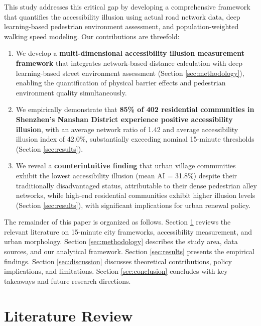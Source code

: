 \documentclass[10pt,conference,compsoc]{IEEEtran}
\begin{document}
This study addresses this critical gap by developing a comprehensive framework that quantifies the accessibility illusion using actual road network data, deep learning-based pedestrian environment assessment, and population-weighted walking speed modeling. Our contributions are threefold:

\begin{enumerate}
    \item We develop a \textbf{multi-dimensional accessibility illusion measurement framework} that integrates network-based distance calculation with deep learning-based street environment assessment (Section \ref{sec:methodology}), enabling the quantification of physical barrier effects and pedestrian environment quality simultaneously.
    \item We empirically demonstrate that \textbf{85\% of 402 residential communities in Shenzhen's Nanshan District experience positive accessibility illusion}, with an average network ratio of 1.42 and average accessibility illusion index of 42.0\%, substantially exceeding nominal 15-minute thresholds (Section \ref{sec:results}).
    \item We reveal a \textbf{counterintuitive finding} that urban village communities exhibit the lowest accessibility illusion (mean AI = 31.8\%) despite their traditionally disadvantaged status, attributable to their dense pedestrian alley networks, while high-end residential communities exhibit higher illusion levels (Section \ref{sec:results}), with significant implications for urban renewal policy.
\end{enumerate}

The remainder of this paper is organized as follows. Section \ref{sec:literature} reviews the relevant literature on 15-minute city frameworks, accessibility measurement, and urban morphology. Section \ref{sec:methodology} describes the study area, data sources, and our analytical framework. Section \ref{sec:results} presents the empirical findings. Section \ref{sec:discussion} discusses theoretical contributions, policy implications, and limitations. Section \ref{sec:conclusion} concludes with key takeaways and future research directions.

\section{Literature Review}
\label{sec:literature}
\end{document}

